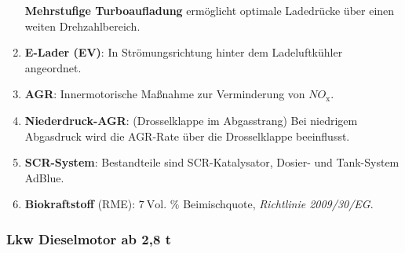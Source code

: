 \documentclass{vorlage-design-main}
\begin{document}
\begin{enumerate}
  \textbf{Mehrstufige Turboaufladung} ermöglicht optimale Ladedrücke
  über einen weiten Drehzahlbereich.
\item
  \textbf{E-Lader (EV)}: In Strömungsrichtung hinter dem Ladeluftkühler
  angeordnet.
\item
  \textbf{AGR}: Innermotorische Maßnahme zur Verminderung von
  $NO_\text{x}$.
\item
  \textbf{Niederdruck-AGR}: (Drosselklappe im Abgasstrang) Bei niedrigem
  Abgasdruck wird die AGR-Rate über die Drosselklappe beeinflusst.
\item
  \textbf{SCR-System}: Bestandteile sind SCR-Katalysator, Dosier- und
  Tank-System AdBlue.
\item
  \textbf{Biokraftstoff} (RME): $\boxed{7~\text{Vol. } \%}$
  Beimischquote, \emph{Richtlinie 2009/30/EG}.
\end{enumerate}

\subsubsection{Lkw Dieselmotor ab 2,8 t}\label{lkw-dieselmotor-ab-28-t}
\end{document}
